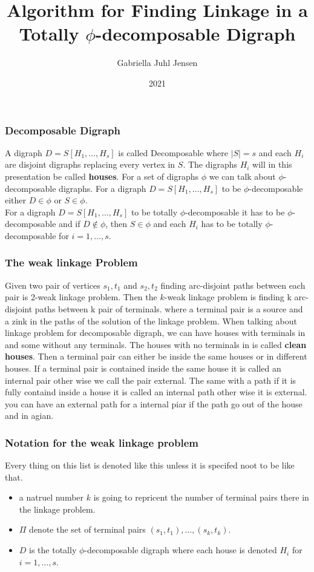 \documentclass{beamer}
\title{Algorithm for Finding Linkage in a Totally $\phi$-decomposable Digraph}
\author{Gabriella Juhl Jensen}
\institute{Jørgen Bang-Jensen}
\date{2021}
\begin{document}
\frame{\titlepage}

\begin{frame}
\frametitle{Decomposable Digraph}
A digraph $D=S[H_1,\dots , H_s]$ is called Decomposable where $|S|=s$ and each $H_i$ are disjoint digraphs replacing every vertex in $S$. 
The digraphs $H_i$ will in this presentation be called \textbf{houses}.
For a set of digraphs $\phi$ we can talk about $\phi$-decomposable digraphs. 
For a digraph $D=S[H_1,\dots ,H_s]$ to be $\phi$-decomposable either $D\in \phi$ or $S\in \phi$.\\

For a digraph $D=S[H_1,\dots ,H_s]$ to be  totally $\phi$-decomposable it has to be $\phi$-decomposable and if $D\notin \phi$, then $S\in \phi$ and each $H_i$ has to be totally $\phi$-decomposable for $i=1,\dots ,s$.
\end{frame}

\begin{frame}
\frametitle{The weak linkage Problem}
Given two pair of vertices $s_1,t_1$ and $s_2,t_2$ finding arc-disjoint paths between each pair is 2-weak linkage problem. Then the $k$-weak linkage problem is finding k arc-disjoint paths between k pair of terminals.
where a terminal  pair is a source and a zink in the paths of the solution of the linkage problem.
When talking about linkage problem for decomposable digraph, we can have houses with terminals in and some without any terminals. 
The houses with no terminals in is called \textbf{clean houses}.
Then a terminal pair can either be inside the same houses or in different houses. If a terminal pair is contained inside the same house it is called an internal pair other wise we call the pair external.
The same with a path if it is fully containd inside a house it is called an internal path other wise it is external.
you can have an external path for a internal piar if the path go out of the house and in agian.
\end{frame}

\begin{frame}
\frametitle{Notation for the weak linkage problem}
Every thing on this list is denoted like this unless it is specifed noot to be like that.
\begin{itemize}
    \item a natruel number $k$ is going to repricent the number of terminal pairs there in the linkage problem.
    \item $\Pi$ denote the set of terminal pairs $(s_1,t_1),\dots ,(s_k,t_k)$.
    \item $D$ is the totally $\phi$-decomposable digraph where each house is denoted $H_i$ for $i=1,\dots ,s$.
\end{itemize}
\end{frame}
\end{document}
